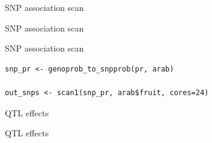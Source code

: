 \documentclass[12pt,t,aspectratio=169]{beamer}
\begin{document}
\begin{frame}[c]{SNP association scan}


\end{frame}



\begin{frame}[c]{SNP association scan}


\end{frame}


\begin{frame}[c,fragile]{SNP association scan}

\begin{center} \begin{minipage}[c]{11.3cm} \begin{semiverbatim}
\begin{lstlisting}[linewidth=11.3cm]
snp_pr <- genoprob_to_snpprob(pr, arab)

out_snps <- scan1(snp_pr, arab$fruit, cores=24)
\end{lstlisting}
\end{semiverbatim} \end{minipage} \end{center}

\end{frame}





\begin{frame}[c]{QTL effects}


\end{frame}



\begin{frame}[c]{QTL effects}


\end{frame}
\end{document}
